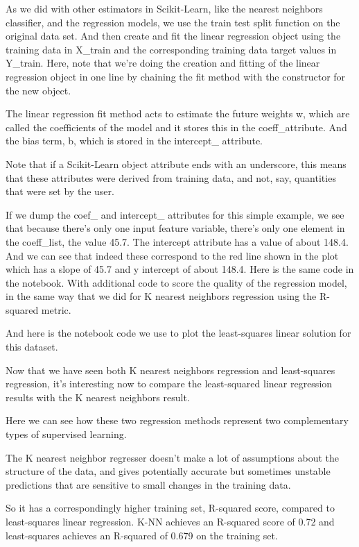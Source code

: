 \begin{multicols}{2}
As we did with other estimators in Scikit-Learn, like the nearest neighbors classifier, and the regression models, we use the train test split function on the original data set. And then create and fit the linear regression object using the training data in X_train and the corresponding training data target values in Y_train. Here, note that we're doing the creation and fitting of the linear regression object in one line by chaining the fit method with the constructor for the new object. 

The linear regression fit method acts to estimate the future weights w, which are called the coefficients of the model and it stores this in the coeff_attribute. And the bias term, b, which is stored in the intercept_ attribute. 

Note that if a Scikit-Learn object attribute ends with an underscore, this means that these attributes were derived from training data, and not, say, quantities that were set by the user. 

If we dump the coef_ and intercept_ attributes for this simple example, we see that because there's only one input feature variable, there's only one element in the coeff_list, the value 45.7. The intercept attribute has a value of about 148.4. And we can see that indeed these correspond to the red line shown in the plot which has a slope of 45.7 and y intercept of about 148.4. Here is the same code in the notebook. With additional code to score the quality of the regression model, in the same way that we did for K nearest neighbors regression using the R-squared metric. 

And here is the notebook code we use to plot the least-squares linear solution for this dataset. 

Now that we have seen both K nearest neighbors regression and least-squares regression, it's interesting now to compare the least-squared linear regression results with the K nearest neighbors result. 

Here we can see how these two regression methods represent two complementary types of supervised learning. 

The K nearest neighbor regresser doesn't make a lot of assumptions about the structure of the data, and gives potentially accurate but sometimes unstable predictions that are sensitive to small changes in the training data. 

So it has a correspondingly higher training set, R-squared score, compared to least-squares linear regression. K-NN achieves an R-squared score of 0.72 and least-squares achieves an R-squared of 0.679 on the training set. 


\end{multicols}
